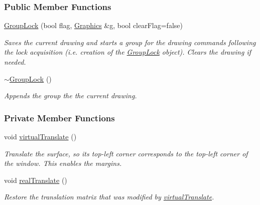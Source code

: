 \subsubsection*{Public Member Functions}
\begin{DoxyCompactItemize}
\item 
\hyperlink{structslb_1_1core_1_1ui_1_1GroupLock_a556cc6347987f79027a0674e636f17d0}{Group\+Lock} (bool flag, \hyperlink{structslb_1_1core_1_1ui_1_1Graphics}{Graphics} \&g, bool clear\+Flag=false)
\begin{DoxyCompactList}\small\item\em Saves the current drawing and starts a group for the drawing commands following the lock acquisition (i.\+e. creation of the \hyperlink{structslb_1_1core_1_1ui_1_1GroupLock}{Group\+Lock} object). Clears the drawing if needed. \end{DoxyCompactList}\item 
\hyperlink{structslb_1_1core_1_1ui_1_1GroupLock_a9abd52ac58f58be639caf4313b07f94e}{$\sim$\+Group\+Lock} ()\hypertarget{structslb_1_1core_1_1ui_1_1GroupLock_a9abd52ac58f58be639caf4313b07f94e}{}\label{structslb_1_1core_1_1ui_1_1GroupLock_a9abd52ac58f58be639caf4313b07f94e}

\begin{DoxyCompactList}\small\item\em Appends the group the the current drawing. \end{DoxyCompactList}\end{DoxyCompactItemize}
\subsubsection*{Private Member Functions}
\begin{DoxyCompactItemize}
\item 
void \hyperlink{structslb_1_1core_1_1ui_1_1GroupLock_a447f62e417fbad50968be9a5edcb83c2}{virtual\+Translate} ()
\begin{DoxyCompactList}\small\item\em Translate the surface, so its top-\/left corner corresponds to the top-\/left corner of the window. This enables the margins. \end{DoxyCompactList}\item 
void \hyperlink{structslb_1_1core_1_1ui_1_1GroupLock_a7a7e70c5bcafc779330c54d935b383c1}{real\+Translate} ()\hypertarget{structslb_1_1core_1_1ui_1_1GroupLock_a7a7e70c5bcafc779330c54d935b383c1}{}\label{structslb_1_1core_1_1ui_1_1GroupLock_a7a7e70c5bcafc779330c54d935b383c1}

\begin{DoxyCompactList}\small\item\em Restore the translation matrix that was modified by \hyperlink{structslb_1_1core_1_1ui_1_1GroupLock_a447f62e417fbad50968be9a5edcb83c2}{virtual\+Translate}. \end{DoxyCompactList}\end{DoxyCompactItemize}
